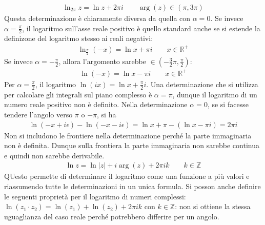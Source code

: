 \documentclass[a4paper, oneside]{article}
\begin{document}
\begin{gather*}
    \ln_{2\pi} z = \ln z + 2\pi i \qquad \arg(z) \in (\pi, 3\pi) 
\end{gather*}
Questa determinazione è chiaramente diversa da quella con $\alpha = 0$. Se
invece $\alpha = \frac{\pi}{2}$, il logaritmo sull'asse reale positivo è quello standard
anche se si estende la definizone del logaritmo stesso ai reali negativi:
\begin{gather*}
    \ln_{\frac{\pi}{2}}(-x) = \ln x + \pi i  \qquad x \in \mathbb{R}^{+}
\end{gather*}
Se invece $\alpha = -\frac{\pi}{2}$, allora l'argomento sarebbe $\in (- \frac{3}{2}\pi, \frac{\pi}{2})$:
\begin{gather*}
    \ln (-x) = \ln x - \pi i \qquad x \in \mathbb{R}^{+}
\end{gather*}
Per $\alpha = \frac{\pi}{2}$, il logaritmo $\ln(ix) = \ln x + \frac{\pi}{2} i$. Una determinazione che si utilizza per calcolare gli integrali sul piano complesso è $\alpha = \pi$, dunque il logaritmo 
di un numero reale positivo non è definito. Nella determinazione $\alpha = 0$, se si facesse tendere
l'angolo verso $\pi$ o $-\pi$, si ha 
\begin{gather*}
    \ln(-x + i\epsilon) - \ln (-x - i\epsilon) = \ln x + \pi - (\ln x - \pi i) = 2\pi i 
\end{gather*}
Non si includono le frontiere nella determinazione perché la parte immaginaria 
non è definita. Dunque sulla frontiera la parte immaginaria non sarebbe continua e 
quindi non sarebbe derivabile.
\begin{gather*}
    \boxed{\ln z = \ln \left| z \right| + i\arg(z) + 2\pi i k \qquad k \in \mathbb{Z} }
\end{gather*}
QUesto permette di determinare il logaritmo come una funzione a più valori e riassumendo tutte le determinazioni in 
un unica formula. Si posson anche definire le seguenti proprietà per il logaritmo di numeri complessi: $\ln(z_1 \cdot z_2) = \ln(z_1) + \ln(z_2) + 2\pi i k$ con $k \in \mathbb{Z}$: 
    non si ottiene la stessa uguaglianza del caso reale perché potrebbero differire per un 
    angolo. 
\end{document}

